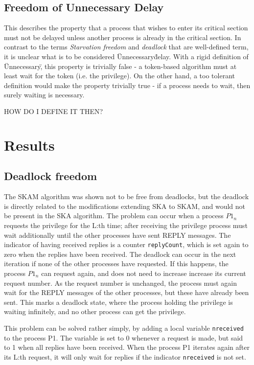 \documentclass[a4paper,12pt]{llncs}
\begin{document}
\subsection{Freedom of Unnecessary Delay}
This describes the property that a process that wishes to enter its critical section must not be delayed unless another process is already in the critical section. In contrast to the terms \emph{Starvation freedom} and \emph{deadlock} that are well-defined term, it is unclear what is to be considered \"Unnecessary\" delay. With a rigid definition of \"Unnecessary\", this property is trivially false - a token-based algorithm must at least wait for the token (i.e. the privilege). On the other hand, a too tolerant definition would make the property trivially true - if a process needs to wait, then surely waiting is necessary.

HOW DO I DEFINE IT THEN?

\section{Results}
\subsection{Deadlock freedom}
The SKAM algorithm was shown not to be free from deadlocks, but the deadlock is directly related to the modifications extending SKA to SKAM, and would not be present in the SKA algorithm. The problem can occur when a process $P1_n$ requests the privilege for the L:th time; after receiving the privilege process must wait additionally until the other processes have sent REPLY messages. The indicator of having received replies is a counter \texttt{replyCount}, which is set again to zero when the replies have been received. The deadlock can occur in the next iteration if none of the other processes have requested. If this happens, the process $P1_n$ can request again, and does not need to increase increase its current request number. As the request number is unchanged, the process must again wait for the REPLY messages of the other processes, but these have already been sent. This marks a deadlock state, where the process holding the privilege is waiting infinitely, and no other process can get the privilege.

This problem can be solved rather simply, by adding a local variable \texttt{nreceived} to the process P1. The variable is set to 0 whenever a request is made, but said to 1 when all replies have been received. When the process P1 iterates again after its L:th request, it will only wait for replies if the indicator \texttt{nreceived} is not set.
\end{document}
